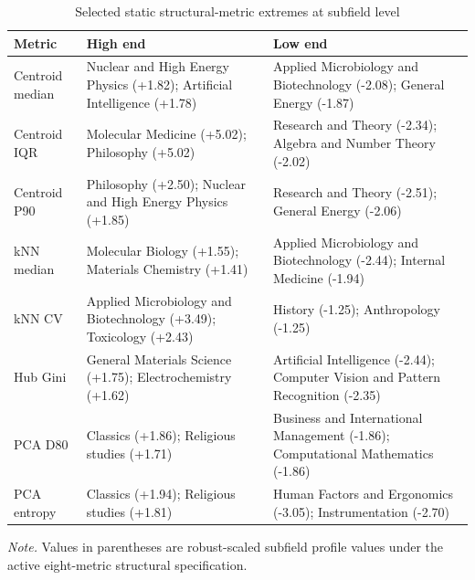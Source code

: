 \begin{table}[H]
\centering
\caption[Selected static metric extremes]{Selected static structural-metric extremes at subfield level}
\label{tab:extreme_subfields}
\scriptsize
\begin{tabular}{@{}p{}p{}p{}@{}}
\hline
\textbf{Metric} & \textbf{High end} & \textbf{Low end} \\
\hline
Centroid median & Nuclear and High Energy Physics (+1.82); Artificial Intelligence (+1.78) & Applied Microbiology and Biotechnology (-2.08); General Energy (-1.87) \\[0.15cm]
Centroid IQR & Molecular Medicine (+5.02); Philosophy (+5.02) & Research and Theory (-2.34); Algebra and Number Theory (-2.02) \\[0.15cm]
Centroid P90 & Philosophy (+2.50); Nuclear and High Energy Physics (+1.85) & Research and Theory (-2.51); General Energy (-2.06) \\[0.15cm]
kNN median & Molecular Biology (+1.55); Materials Chemistry (+1.41) & Applied Microbiology and Biotechnology (-2.44); Internal Medicine (-1.94) \\[0.15cm]
kNN CV & Applied Microbiology and Biotechnology (+3.49); Toxicology (+2.43) & History (-1.25); Anthropology (-1.25) \\[0.15cm]
Hub Gini & General Materials Science (+1.75); Electrochemistry (+1.62) & Artificial Intelligence (-2.44); Computer Vision and Pattern Recognition (-2.35) \\[0.15cm]
PCA D80 & Classics (+1.86); Religious studies (+1.71) & Business and International Management (-1.86); Computational Mathematics (-1.86) \\[0.15cm]
PCA entropy & Classics (+1.94); Religious studies (+1.81) & Human Factors and Ergonomics (-3.05); Instrumentation (-2.70) \\[0.15cm]
\hline
\end{tabular}
\par\vspace{0.12cm}
\footnotesize\textit{Note.} Values in parentheses are robust-scaled subfield profile values under the active eight-metric structural specification.
\end{table}
